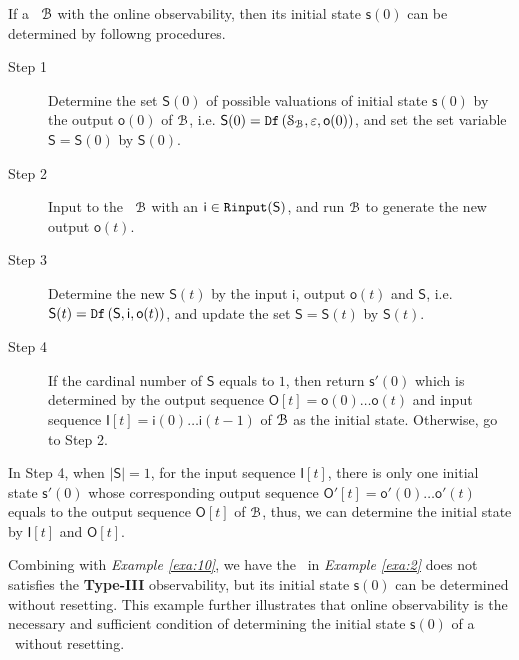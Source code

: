 

 If a \BCN\ ${\mathcal{B}}$ with the online observability, then its initial state $\mathsf{s}(0)$ can be determined by followng procedures.

\begin{description}
	\item[Step 1]  Determine the set $\mathsf{S}(0)$ of possible valuations of initial state $\mathsf{s}(0)$ by the output $\mathsf{o}(0)$ of ${\mathcal{B}}$, i.e. $\mathsf{S}(0)={\tt Df}\left(\mathcal{S}_{\mathcal{B}},\varepsilon,\mathsf{o}(0)\right)$, and set the set variable $\mathsf{S}=\mathsf{S}(0)$ by $\mathsf{S}(0)$.
	\item[Step 2] Input to the \BCN\ ${\mathcal{B}}$ with an $\mathsf{i}\in{\tt Rinput}(\mathsf{S})$, and run ${\mathcal{B}}$ to generate the new output $\mathsf{o}(t)$. 
	\item[Step 3] Determine the new $\mathsf{S}(t)$ by the input $\mathsf{i}$, output $\mathsf{o}(t)$ and $\mathsf{S}$, i.e. $\mathsf{S}(t)={\tt Df}\left(\mathsf{S},\mathsf{i},\mathsf{o}(t)\right)$, and update the set $\mathsf{S}=\mathsf{S}(t)$ by $\mathsf{S}(t)$.
	\item[Step 4] If the cardinal number of $\mathsf{S}$ equals to $1$, then return $\mathsf{s}'(0)$ which is determined by the output sequence $\mathsf{O}[t]=\mathsf{o}(0)\ldots\mathsf{o}(t)$ and input sequence $\mathsf{I}[t]=\mathsf{i}(0)\ldots\mathsf{i}(t-1)$ of ${\mathcal{B}}$ as the initial state. %
	 Otherwise, go to Step 2.
\end{description}
  In Step 4, when $|\mathsf{S}|=1$, for the input sequence $\mathsf{I}[t]$, there is only one initial state $\mathsf{s}'(0)$ whose corresponding output sequence  $\mathsf{O}'[t]=\mathsf{o}'(0)\ldots\mathsf{o}'(t)$ equals to the output sequence $\mathsf{O}[t]$ of ${\mathcal{B}}$, thus, we can determine the initial state by $\mathsf{I}[t]$ and $\mathsf{O}[t]$. 

Combining with {\em Example \ref{exa:10}}, we have the \BCN\ in {\em Example \ref{exa:2}} does not satisfies the {\bf Type-III} observability, but its initial state $\mathsf{s}(0)$  can be determined without resetting. 
 This example further illustrates that online observability is the necessary and sufficient condition of determining the initial state $\mathsf{s}(0)$ of a \BCN\  without  resetting.


